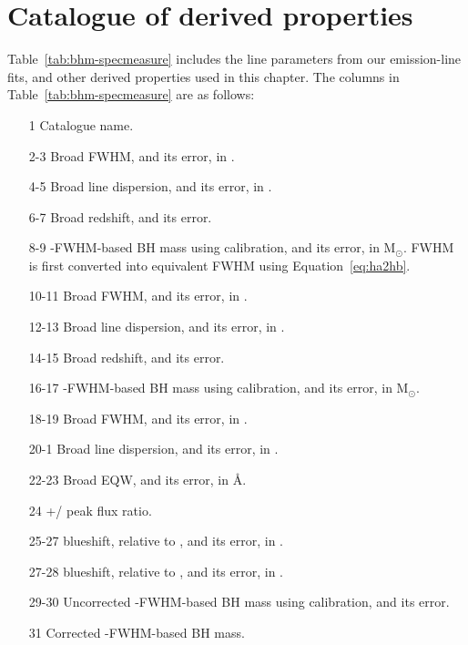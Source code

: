 \section{Catalogue of derived properties}

Table~\ref{tab:bhm-specmeasure} includes the line parameters from our emission-line fits, and other derived properties used in this chapter. 
The columns in Table~\ref{tab:bhm-specmeasure} are as follows:

\begin{itemize}

 \item[1] Catalogue name.

 \item[2-3] Broad \ha FWHM, and its error, in \kms.

 \item[4-5] Broad \ha line dispersion, and its error, in \kms.

 \item[6-7] Broad \ha redshift, and its error. 

 \item[8-9] \hans-FWHM-based BH mass using \citet{vestergaard06} calibration, and its error, in M$_\odot$. \ha FWHM is first converted into equivalent \hb FWHM using Equation~\ref{eq:ha2hb}. 

 \item[10-11] Broad \hb FWHM, and its error, in \kms.

 \item[12-13] Broad \hb line dispersion, and its error, in \kms.

 \item[14-15] Broad \hb redshift, and its error. 

 \item[16-17] \hbns-FWHM-based BH mass using \citet{vestergaard06} calibration, and its error, in M$_\odot$.  

 \item[18-19] Broad  FWHM, and its error, in \kms.

 \item[20-1] Broad  line dispersion, and its error, in \kms.

 \item[22-23] Broad  EQW, and its error, in \AA.

 \item[24] +/ peak flux ratio.

 \item[25-27]  blueshift, relative to \hans, and its error, in \kms.

 \item[27-28]  blueshift, relative to \hbns, and its error, in \kms.

 \item[29-30] Uncorrected -FWHM-based BH mass using \citet{vestergaard06} calibration, and its error.

 \item[31] Corrected -FWHM-based BH mass.

\end{itemize}


